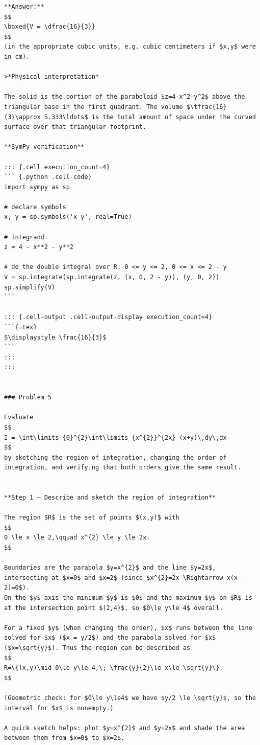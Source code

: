\documentclass[
  letterpaper,
  DIV=11,
  numbers=noendperiod]{scrreprt}
\begin{document}
\begin{verbatim}
**Answer:**  
$$
\boxed{V = \dfrac{16}{3}}
$$
(in the appropriate cubic units, e.g. cubic centimeters if $x,y$ were in cm).

>*Physical interpretation*

The solid is the portion of the paraboloid $z=4-x^2-y^2$ above the triangular base in the first quadrant. The volume $\tfrac{16}{3}\approx 5.333\ldots$ is the total amount of space under the curved surface over that triangular footprint.

**SymPy verification**

::: {.cell execution_count=4}
``` {.python .cell-code}
import sympy as sp

# declare symbols
x, y = sp.symbols('x y', real=True)

# integrand
z = 4 - x**2 - y**2

# do the double integral over R: 0 <= y <= 2, 0 <= x <= 2 - y
V = sp.integrate(sp.integrate(z, (x, 0, 2 - y)), (y, 0, 2))
sp.simplify(V)
```

::: {.cell-output .cell-output-display execution_count=4}
```{=tex}
$\displaystyle \frac{16}{3}$
```
:::
:::


### Problem 5 

Evaluate
$$
I = \int\limits_{0}^{2}\int\limits_{x^{2}}^{2x} (x+y)\,dy\,dx
$$
by sketching the region of integration, changing the order of integration, and verifying that both orders give the same result.


**Step 1 — Describe and sketch the region of integration**

The region $R$ is the set of points $(x,y)$ with
$$
0 \le x \le 2,\qquad x^{2} \le y \le 2x.
$$

Boundaries are the parabola $y=x^{2}$ and the line $y=2x$, intersecting at $x=0$ and $x=2$ (since $x^{2}=2x \Rightarrow x(x-2)=0$).  
On the $y$-axis the minimum $y$ is $0$ and the maximum $y$ on $R$ is at the intersection point $(2,4)$, so $0\le y\le 4$ overall.

For a fixed $y$ (when changing the order), $x$ runs between the line solved for $x$ ($x = y/2$) and the parabola solved for $x$ ($x=\sqrt{y}$). Thus the region can be described as
$$
R=\{(x,y)\mid 0\le y\le 4,\; \frac{y}{2}\le x\le \sqrt{y}\}.
$$

(Geometric check: for $0\le y\le4$ we have $y/2 \le \sqrt{y}$, so the interval for $x$ is nonempty.)

A quick sketch helps: plot $y=x^{2}$ and $y=2x$ and shade the area between them from $x=0$ to $x=2$.



\end{verbatim}
\end{document}
